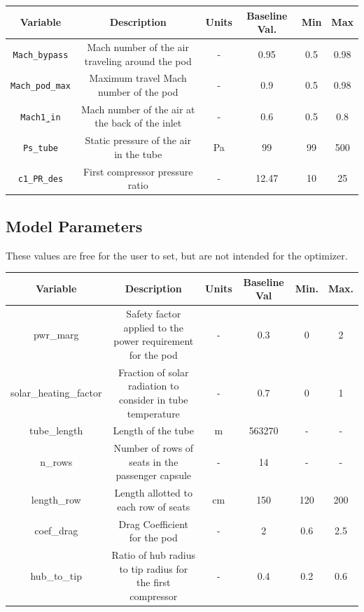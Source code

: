 \documentclass[heading.tex]{subfiles}
\begin{document}
\begin{adjustwidth}{-3cm}{-3cm}
\begin{tabular}{|c|c|c|c|c|c|}
\hline 
Variable & Description & Units & Baseline Val. & Min & Max \\ 
\hline 
\texttt{Mach\_bypass} & Mach number of the air traveling around the pod & - & 0.95 & 0.5 & 0.98 \\ 
\hline 
\texttt{Mach\_pod\_max} & Maximum travel Mach number of the pod & - & 0.9 & 0.5 & 0.98 \\ 
\hline 
\texttt{Mach\c1\_in} & Mach number of the air at the back of the inlet & - & 0.6 & 0.5 & 0.8 \\ 
\hline 
\texttt{Ps\_tube} & Static pressure of the air in the tube & Pa & 99 & 99 & 500 \\ 
\hline 
\texttt{c1\_PR\_des} & First compressor pressure ratio & - & 12.47 & 10 & 25 \\ 
\hline 
\end{tabular} 
\end{adjustwidth}

\subsection{Model Parameters}
These values are free for the user to set, but are not intended for the optimizer.

\begin{adjustwidth}{-3cm}{-3cm}
\begin{tabular}{|c|c|c|c|c|c|}
\hline 
Variable & Description & Units & Baseline Val & Min. & Max. \\ 
\hline 
pwr\_marg & Safety factor applied to the power requirement for the pod & - & 0.3 & 0 & 2 \\ 
\hline 
solar\_heating\_factor & Fraction of solar radiation to consider in tube temperature & - & 0.7 & 0 & 1 \\ 
\hline 
tube\_length & Length of the tube & m & 563270 & - & - \\ 
\hline 
n\_rows & Number of rows of seats in the passenger capsule & - & 14 & - & - \\ 
\hline 
length\_row & Length allotted to each row of seats & cm & 150 & 120 & 200 \\ 
\hline 
coef\_drag & Drag Coefficient for the pod & - & 2 & 0.6 & 2.5 \\ 
\hline 
hub\_to\_tip & Ratio of hub radius to tip radius for the first compressor & - & 0.4 & 0.2 & 0.6 \\ 
\hline 
\end{tabular} 
\end{adjustwidth}
\end{document}
